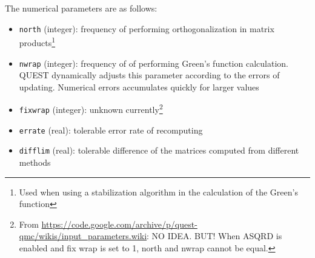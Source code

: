 \documentclass[12pt]{article}
\begin{document}
        The numerical parameters are as follows:
        \begin{itemize}
            \item \texttt{north} (integer): frequency of performing orthogonalization in matrix products\footnote{Used when using a stabilization algorithm in the calculation of the Green's function}
            \item \texttt{nwrap} (integer): frequency of of performing Green's function calculation. QUEST dynamically adjusts this parameter according to the errors of updating. Numerical errors accumulates quickly for larger values
            \item \texttt{fixwrap} (integer): unknown currently\footnote{From \url{https://code.google.com/archive/p/quest-qmc/wikis/input_parameters.wiki}: NO IDEA. BUT! When ASQRD is enabled and fix wrap is set to 1, north and nwrap cannot be equal.}
            \item \texttt{errate} (real): tolerable error rate of recomputing
            \item \texttt{difflim} (real): tolerable difference of the matrices computed from different methods
        \end{itemize}
\end{document}
